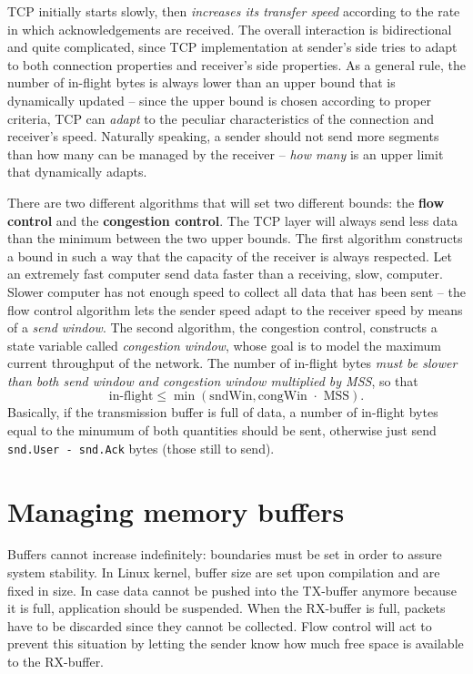 \documentclass[10pt]{book}
\begin{document}
TCP initially starts slowly, then \emph{increases its transfer speed} according
to the rate in which acknowledgements are received. The overall interaction is
bidirectional and quite complicated, since TCP implementation at sender's side
tries to adapt to both connection properties and receiver's side properties.
As a general rule, the number of in-flight bytes is always lower than an upper
bound that is dynamically updated \--- since the upper bound is chosen
according to proper criteria, TCP can \emph{adapt} to the peculiar
characteristics of the connection and receiver's speed. Naturally speaking, a
sender should not send more segments than how many can be managed by the
receiver \--- \emph{how many} is an upper limit that dynamically adapts.

There are two different algorithms that will set two different bounds: the
\textbf{flow control} and the \textbf{congestion control}. The TCP layer will
always send less data than the minimum between the two upper bounds. The first
algorithm constructs a bound in such a way that the capacity of the receiver is
always respected. Let an extremely fast computer send data faster than a
receiving, slow, computer. Slower computer has not enough speed to collect all
data that has been sent \--- the flow control algorithm lets the sender speed
adapt to the receiver speed by means of a \emph{send window}. The second
algorithm, the congestion control, constructs a state variable called
\emph{congestion window}, whose goal is to model the maximum current throughput
of the network. The number of in-flight bytes \emph{must be slower than both
send window and congestion window multiplied by MSS}, so that
$$\mbox{in-flight} \leq \min(\mbox{sndWin}, \mbox{congWin } \cdot \mbox{ MSS}).$$
Basically, if the transmission buffer is full of data, a number of in-flight
bytes equal to the minumum of both quantities should be sent, otherwise just
send \texttt{snd.User - snd.Ack} bytes (those still to send).

\section{Managing memory buffers}

Buffers cannot increase indefinitely: boundaries must be set in order to assure
system stability. In Linux kernel, buffer size are set upon compilation and are
fixed in size. In case data cannot be pushed into the TX-buffer anymore because
it is full, application should be suspended. When the RX-buffer is full,
packets have to be discarded since they cannot be collected. Flow control will
act to prevent this situation by letting the sender know how much free space is
available to the RX-buffer.
\end{document}
